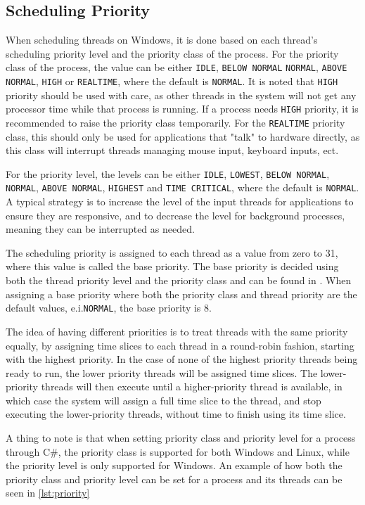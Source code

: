 \subsection{Scheduling Priority}

When scheduling threads on Windows, it is done based on each thread's scheduling priority level and the priority class of the process.  For the priority class of the process, the value can be either \texttt{IDLE}, \texttt{BELOW NORMAL} \texttt{NORMAL}, \texttt{ABOVE NORMAL}, \texttt{HIGH} or \texttt{REALTIME}, where the default is \texttt{NORMAL}. It is noted that \texttt{HIGH} priority should be used with care, as other threads in the system will not get any processor time while that process is running. If a process needs \texttt{HIGH} priority, it is recommended to raise the priority class temporarily. For the \texttt{REALTIME} priority class, this should only be used for applications that "talk" to hardware directly, as this class will interrupt threads managing mouse input, keyboard inputs, ect.\cite{priority}\newline

For the priority level, the levels can be either \texttt{IDLE}, \texttt{LOWEST}, \texttt{BELOW NORMAL}, \texttt{NORMAL}, \texttt{ABOVE NORMAL}, \texttt{HIGHEST} and \texttt{TIME CRITICAL}, where the default is \texttt{NORMAL}. A typical strategy is to increase the level of the input threads for applications to ensure they are responsive, and to decrease the level for background processes, meaning they can be interrupted as needed.\cite{priority}

The scheduling priority is assigned to each thread as a value from zero to 31, where this value is called the base priority. The base priority is decided using both the thread priority level and the priority class and can be found in \cite{priority}. When assigning a base priority where both the priority class and thread priority are the default values, e.i.\texttt{NORMAL}, the base priority is $8$.\cite{priority}\newline

The idea of having different priorities is to treat threads with the same priority equally, by assigning time slices to each thread in a round-robin fashion, starting with the highest priority. In the case of none of the highest priority threads being ready to run, the lower priority threads will be assigned time slices. The lower-priority threads will then execute until a higher-priority thread is available, in which case the system will assign a full time slice to the thread, and stop executing the lower-priority threads, without time to finish using its time slice.\cite{priority}



A thing to note is that when setting priority class and priority level for a process through C\#, the priority class is supported for both Windows and Linux, while the priority level is only supported for Windows. An example of how both the priority class and priority level can be set for a process and its threads can be seen in \cref{lst:priority}


